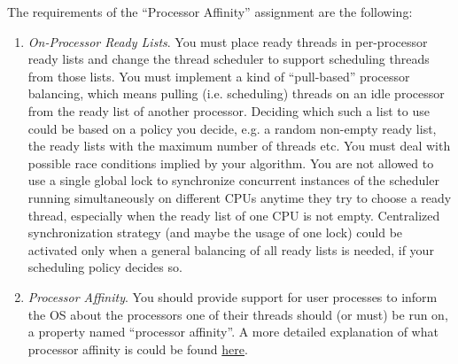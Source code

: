 The requirements of the ``Processor Affinity'' assignment are the following:
\begin{enumerate}
    \item \textit{On-Processor Ready Lists}. You must place ready threads in per-processor ready lists and change the thread scheduler to support scheduling threads from those lists. You must implement a kind of ``pull-based'' processor balancing, which means pulling (i.e. scheduling) threads on an idle processor from the ready list of another processor. Deciding which such a list to use could be based on a policy you decide, e.g. a random non-empty ready list, the ready lists with the maximum number of threads etc. You must deal with possible race conditions implied by your algorithm. You are not allowed to use a single global lock to synchronize concurrent instances of the scheduler running simultaneously on different CPUs anytime they try to choose a ready thread, especially when the ready list of one CPU is not empty. Centralized synchronization strategy (and maybe the usage of one lock) could be activated only when a general balancing of all ready lists is needed, if your scheduling policy decides so. 

    \item \textit{Processor Affinity}. You should provide support for user processes to inform the OS about the processors one of their threads should (or must) be run on, a property named ``processor affinity''. A more detailed explanation of what processor affinity is could be found \href{https://docs.microsoft.com/en-us/windows-hardware/drivers/kernel/interrupt-affinity-and-priority#about-kaffinity}{here}.
    
        \begin{enumerate}


\end{enumerate}
\end{enumerate}
